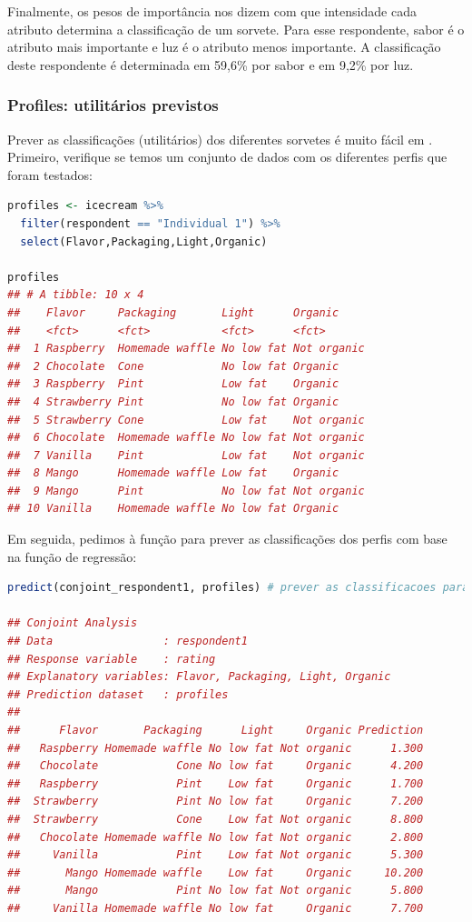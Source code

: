 \documentclass{article}
\begin{document}
Finalmente, os pesos de importância nos dizem com que intensidade cada atributo determina a classificação de um sorvete. Para esse respondente, sabor é o atributo mais importante e luz é o atributo menos importante. A classificação deste respondente é determinada em 59,6\% por sabor e em 9,2\% por luz.

\subsubsection{Profiles: utilitários previstos}

Prever as classificações (utilitários) dos diferentes sorvetes é muito fácil em \faRProject. Primeiro, verifique se temos um conjunto de dados com os diferentes perfis que foram testados:

\begin{lstlisting}[language=R]
profiles <- icecream %>% 
  filter(respondent == "Individual 1") %>% 
  select(Flavor,Packaging,Light,Organic)

profiles
## # A tibble: 10 x 4
##    Flavor     Packaging       Light      Organic    
##    <fct>      <fct>           <fct>      <fct>      
##  1 Raspberry  Homemade waffle No low fat Not organic
##  2 Chocolate  Cone            No low fat Organic    
##  3 Raspberry  Pint            Low fat    Organic    
##  4 Strawberry Pint            No low fat Organic    
##  5 Strawberry Cone            Low fat    Not organic
##  6 Chocolate  Homemade waffle No low fat Not organic
##  7 Vanilla    Pint            Low fat    Not organic
##  8 Mango      Homemade waffle Low fat    Organic    
##  9 Mango      Pint            No low fat Not organic
## 10 Vanilla    Homemade waffle No low fat Organic
\end{lstlisting}

Em seguida, pedimos à função  para prever as classificações dos perfis com base na função de regressão:

\begin{lstlisting}[language=R]
predict(conjoint_respondent1, profiles) # prever as classificacoes para os perfis com base na analise conjunta

## Conjoint Analysis
## Data                 : respondent1 
## Response variable    : rating 
## Explanatory variables: Flavor, Packaging, Light, Organic 
## Prediction dataset   : profiles 
## 
##      Flavor       Packaging      Light     Organic Prediction
##   Raspberry Homemade waffle No low fat Not organic      1.300
##   Chocolate            Cone No low fat     Organic      4.200
##   Raspberry            Pint    Low fat     Organic      1.700
##  Strawberry            Pint No low fat     Organic      7.200
##  Strawberry            Cone    Low fat Not organic      8.800
##   Chocolate Homemade waffle No low fat Not organic      2.800
##     Vanilla            Pint    Low fat Not organic      5.300
##       Mango Homemade waffle    Low fat     Organic     10.200
##       Mango            Pint No low fat Not organic      5.800
##     Vanilla Homemade waffle No low fat     Organic      7.700
\end{lstlisting}
\end{document}
